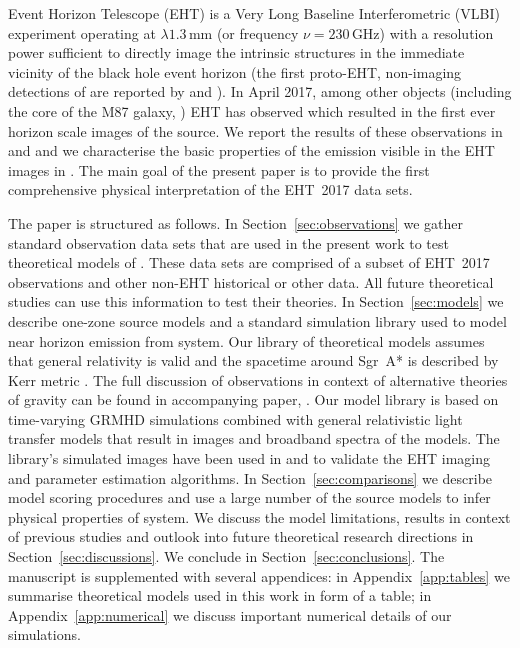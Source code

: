 Event Horizon Telescope (EHT) is a Very Long Baseline Interferometric (VLBI) experiment 
operating at $\lambda1.3$\,mm (or frequency $\nu=230$\,GHz)
with a resolution power sufficient to directly image the intrinsic \sgra structures in the immediate vicinity of the black hole event horizon (the first proto-EHT, non-imaging detections of \sgra are reported by \citealt{2008Natur.455...78D, 2015Sci...350.1242J} and \citealt{2018ApJ...859...60L}). In April 2017, among other objects (including the core of the M87 galaxy, ) EHT has observed \sgra which resulted in the first ever horizon scale images of the source. We report the results of these observations in  and  and we characterise the basic properties of the emission visible in the EHT images in . The main goal of the present paper  is to provide the first comprehensive physical interpretation of the EHT~2017 \sgra data sets. 

The paper is structured as follows. In Section~\ref{sec:observations} we gather standard observation data sets that are used in the present work to test theoretical models of \sgra. These data sets are comprised of a subset of EHT~2017 observations and other non-EHT historical or other data. All future theoretical studies can use this information to test their theories. In Section~\ref{sec:models} we describe one-zone source models and a standard simulation library used to model near horizon emission from \sgra system. Our library of theoretical models assumes that general relativity is valid and the spacetime around Sgr~A* is described by Kerr metric \citep{1963PhRvL..11..237K}. The full discussion of \sgra observations in context of alternative theories of gravity can be found in accompanying paper, .
Our model library is based on time-varying GRMHD simulations combined with general relativistic light transfer models that result in images and broadband spectra of the models. The library's simulated images have been used in  and  to validate the \sgra EHT imaging and parameter estimation algorithms.
In Section~\ref{sec:comparisons} we describe model scoring procedures and use a large number of the source models to infer physical properties of \sgra system. We discuss the model limitations, results in context of previous studies and outlook into future \sgra theoretical research directions in Section~\ref{sec:discussions}. We conclude in Section~\ref{sec:conclusions}.
The manuscript is supplemented with several appendices: in Appendix~\ref{app:tables} we summarise theoretical models used in this work in form of a table; in Appendix~\ref{app:numerical} we discuss important numerical details of our simulations.


